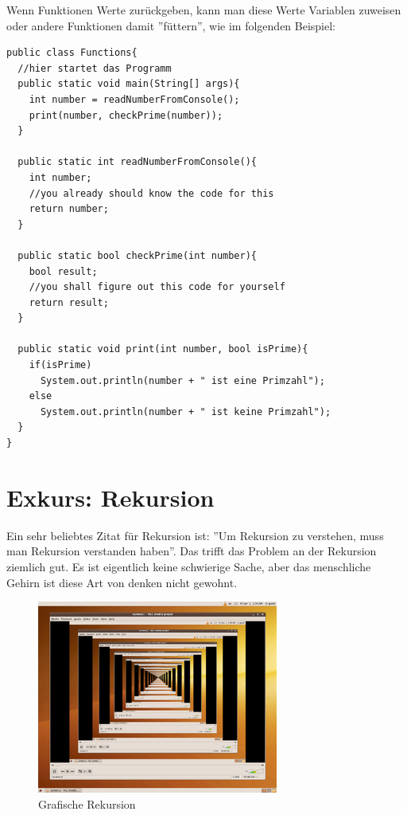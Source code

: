 Wenn Funktionen Werte zurückgeben, kann man diese Werte Variablen zuweisen oder andere Funktionen damit ''füttern'', wie im folgenden Beispiel:

\begin{minipage}{\textwidth}
\begin{lstlisting}
public class Functions{
  //hier startet das Programm
  public static void main(String[] args){
    int number = readNumberFromConsole();
    print(number, checkPrime(number));
  }      
  
  public static int readNumberFromConsole(){
    int number;
    //you already should know the code for this
    return number;
  }
  
  public static bool checkPrime(int number){
    bool result;
    //you shall figure out this code for yourself
    return result;
  }
  
  public static void print(int number, bool isPrime){
    if(isPrime)
      System.out.println(number + " ist eine Primzahl");
    else
      System.out.println(number + " ist keine Primzahl");
  }
}
\end{lstlisting}
\end{minipage}

\section{Exkurs: Rekursion}

Ein sehr beliebtes Zitat für Rekursion ist: ''Um Rekursion zu verstehen, muss man Rekursion verstanden haben''. Das trifft das Problem an der Rekursion ziemlich gut. Es ist eigentlich keine schwierige Sache, aber das menschliche Gehirn ist diese Art von denken nicht gewohnt. 

\begin{figure}
	\begin{center}\includegraphics{images/Rekursion.png}\end{center}
	\caption{Grafische Rekursion}
\end{figure}

